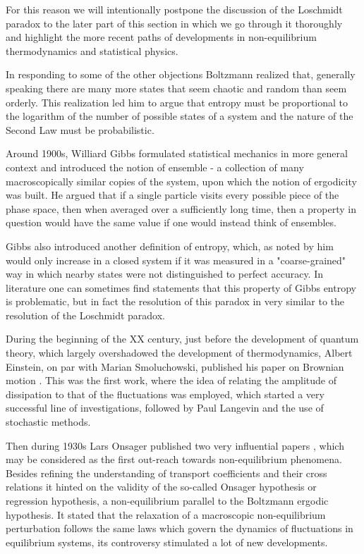 \documentclass[a4paper,12pt]{article}
\begin{document}
For this reason we will intentionally postpone the discussion of the Loschmidt paradox to the later part of this section in which we go through it thoroughly and highlight the more recent paths of developments in non-equilibrium thermodynamics and statistical physics.

In responding to some of the other objections Boltzmann realized that, generally speaking there are many more states that seem chaotic and random than seem orderly. This realization led him to argue that entropy must be proportional to the logarithm of the number of possible states of a system and the nature of the Second Law must be probabilistic.

Around 1900s, Williard Gibbs formulated statistical mechanics in more general context and introduced the notion of ensemble - a collection of many macroscopically similar copies of the system, upon which the notion of ergodicity was built. 
He argued that if a single particle visits every possible piece of the phase space, then when averaged over a sufficiently long time, then a property in question would have the same value if one would instead think of ensembles. 

Gibbs also introduced another definition of entropy, which, as noted by him \cite{Gibbs:1928tw} would only increase in a closed system if it was measured in a "coarse-grained" way in which nearby states were not distinguished to perfect accuracy. In literature one can sometimes find statements \cite{Evans:2241458} that this property of Gibbs entropy is problematic, but in fact the resolution of this paradox in very similar to the resolution of the Loschmidt paradox.

During the beginning of the XX century, just before 
the development of quantum theory, which largely overshadowed the development of thermodynamics, Albert Einstein, on par with Marian Smoluchowski, published his paper on Brownian motion \cite{Einstein:eEYNf903}. This was the first work, where the idea of relating the amplitude of dissipation to that of the fluctuations was employed, which started a very successful line of investigations, followed by Paul Langevin and the use of stochastic methods.

Then during 1930s Lars Onsager published two very influential papers \cite{Onsager:zgWBDrcO, Onsager:sJs1Kffm}, which may be considered as the first out-reach towards non-equilibrium phenomena.
Besides refining the understanding of transport coefficients and their cross relations it hinted on the validity of the so-called Onsager hypothesis or regression hypothesis, a non-equilibrium parallel to the Boltzmann ergodic hypothesis. It stated that the relaxation of a macroscopic non-equilibrium perturbation follows the same laws which govern the dynamics of fluctuations in equilibrium systems, its controversy stimulated a lot of new developments.
\end{document}
